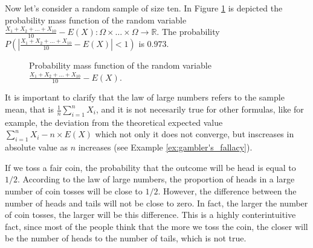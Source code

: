 \begin{example}
Now let's consider a random sample of size ten. In Figure \ref{fig:law_large_numbers_2} is depicted the probability mass function of the random variable $\frac{X_1 + X_2 + \ldots +  X_{10}}{10} - E(X): \Omega \times \ldots \times \Omega \rightarrow \mathbb{R}$. The probability $P(  |\frac{X_1 + X_2 + \ldots +  X_{10}}{10} - E(X)| < 1 )$ is $0.973$.

\begin{figure}[t]
\centering
{}
\caption{\label{fig:law_large_numbers_2}Probability mass function of the random variable $\frac{X_1 + X_2 + \ldots +  X_{10}}{10} - E(X)$.}
\end{figure}

\end{example}

It is important to clarify that the law of large numbers refers to the sample mean, that is $\frac {1}{n} \sum_{i=1}^{n} X_{i}$, and it is not necesarily true for other formulas, like for example, the deviation from the theoretical expected value $\sum_{i=1}^{n} X_{i} - n \times E(X)$ which not only it does not converge, but inscreases in absolute value as $n$ increases (see Example \ref{ex:gambler's_fallacy}).

\begin{example}
\label{ex:gambler's_fallacy}
If we toss a fair coin, the probability that the outcome will be head is equal to $1/2$. According to the law of large numbers, the proportion of heads in a large number of coin tosses will be close to $1/2$. However, the difference between the number of heads and tails will not be close to zero. In fact, the larger the number of coin tosses, the larger will be this difference. This is a highly conterintuitive fact, since most of the people think that the more we toss the coin, the closer will be the number of heads to the number of tails, which is not true.
\end{example}

